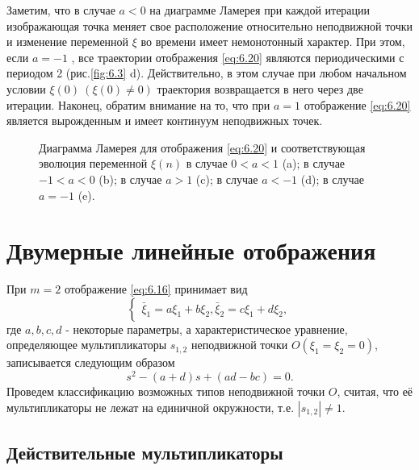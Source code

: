 Заметим, что в случае $a<0$ на диаграмме Ламерея при каждой итерации
изображающая точка меняет свое расположение относительно неподвижной
точки и изменение переменной $\xi$ во времени имеет немонотонный характер.
При этом, если $a=-1$ , все траектории отображения \eqref{eq:6.20} являются
периодическими с периодом 2 (рис.\ref{fig:6.3} d). Действительно, в этом случае при
любом начальном условии $\xi(0) ~ (\xi(0) \neq 0)$ траектория возвращается в него через
две итерации. Наконец, обратим внимание на то, что при $a=1$ отображение
\eqref{eq:6.20} является вырожденным и имеет континуум неподвижных точек.
\begin{figure}[h]
        \centering
        \caption{Диаграмма Ламерея для отображения \eqref{eq:6.20} и соответствующая
        эволюция переменной $\xi(n)$ в случае $0<a<1$ (a); в случае
$-1<a<0$ (b); в случае $a>1$ (c); в случае $a<-1$ (d); в случае $a=-1$ (e).}
        \label{fig:}
\end{figure}

\section{Двумерные линейные отображения}%
\label{sec:6.5}

При $m=2$ отображение \eqref{eq:6.16} принимает вид
\begin{equation}
        \label{eq:6.21}
        \begin{cases}
                \bar \xi_1 = a \xi_1 + b \xi_2,
               \bar \xi_2 = c\xi_1+ d\xi_2,
        \end{cases}
\end{equation}
где $a,b,c,d$ - некоторые параметры, а характеристическое уравнение, определяющее мультипликаторы $s_{1,2}$ неподвижной точки $O(\xi_1=\xi_2=0)$, записывается следующим образом
\begin{equation}
        \label{eq:6.22}
        s^2 - (a+d) s + (ad-bc) = 0.
\end{equation}
Проведем классификацию возможных типов неподвижной точки $O$, считая, что её мультипликаторы не лежат на единичной окружности, т.е. $|s_{1,2}| \neq 1$.

\subsection{Действительные мультипликаторы}%
\label{sub:6.5.1}

